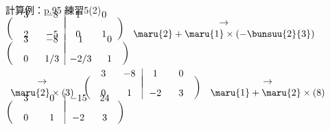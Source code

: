 \documentclass[a4paper,10pt,onecolumn,oneside,notitlepage,final]{jsarticle} %
\begin{document}
\vspace{10mm}
計算例：p.95 練習5(2)\\%

$\left(\begin{array}{cc|cc}
\hspace{6mm}&\hspace{6mm}&\hspace{6mm}&\hspace{6mm}\\[-7mm]
   3&  -8&   1&   0\\[3mm]
   2&  -5&   0&   1\\
\end{array}\right)$
$\begin{array}{ll}
\hfill\to\hfill\\
\maru{2}+\maru{1}\times(-\bunsuu{2}{3})\\
\end{array}$
$\left(\begin{array}{cc|cc}
\hspace{6mm}&\hspace{6mm}&\hspace{6mm}&\hspace{6mm}\\[-7mm]
   3&  -8&   1&   0\\[3mm]
   0& 1/3&-2/3&   1\\
\end{array}\right)$

$\begin{array}{ll}
\hfill\to\hfill\\
\maru{2}\times(3)\\
\end{array}$
$\left(\begin{array}{cc|cc}
\hspace{6mm}&\hspace{6mm}&\hspace{6mm}&\hspace{6mm}\\[-7mm]
   3&  -8&   1&   0\\[3mm]
   0&   1&  -2&   3\\
\end{array}\right)$
$\begin{array}{ll}
\hfill\to\hfill\\
\maru{1}+\maru{2}\times(8)\\
\end{array}$
$\left(\begin{array}{cc|cc}
\hspace{6mm}&\hspace{6mm}&\hspace{6mm}&\hspace{6mm}\\[-7mm]
   3&   0& -15&  24\\[3mm]
   0&   1&  -2&   3\\
\end{array}\right)$\\
\end{document}
